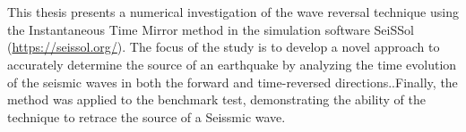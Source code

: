 \chapter{\abstractname}

This thesis presents a numerical investigation of the wave reversal technique using the Instantaneous 
Time Mirror method in the simulation software SeiSSol (\href{https://seissol.org/}{https://seissol.org/}). The focus of 
the study is to develop a novel approach to accurately determine the source of an earthquake by analyzing the time evolution 
of the seismic waves in both the forward and time-reversed directions..Finally, the method was applied to the benchmark test, 
demonstrating the ability of the technique to retrace the source of a Seissmic wave.